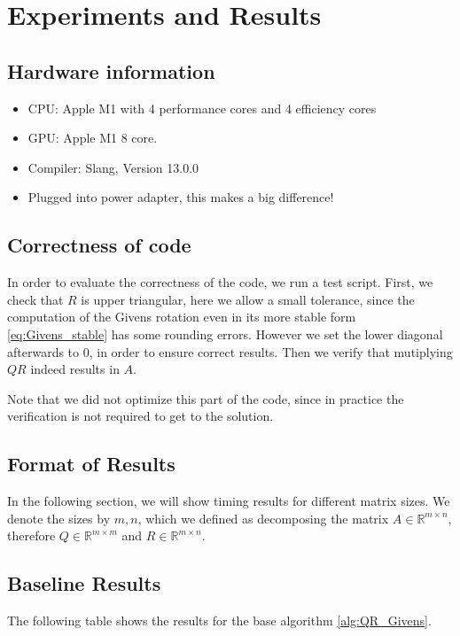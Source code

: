 \documentclass[a4paper]{scrartcl}
\begin{document}
\section{Experiments and Results}

    \subsection{Hardware information}
        \begin{itemize}
            \item CPU: Apple M1 with 4 performance cores and 4 efficiency cores
            \item GPU: Apple M1 8 core.
            \item Compiler: Slang, Version 13.0.0
            \item Plugged into power adapter, this makes a big difference!
        \end{itemize}

    \subsection{Correctness of code}
        In order to evaluate the correctness of the code, we run a test script.
        First, we check that $R$ is upper triangular, here we allow a small
        tolerance, since the computation of the Givens rotation even in its more
        stable form \ref{eq:Givens_stable} has some rounding errors. However we
        set the lower diagonal afterwards to 0, in order to ensure correct
        results. Then we verify that mutiplying $QR$ indeed results in $A$.
        
        Note that we did not optimize this part of the code, since in practice
        the verification is not required to get to the solution.

    \subsection{Format of Results}
        In the following section, we will show timing results for different
        matrix sizes. We denote the sizes by $m,n$, which we defined as
        decomposing the matrix $A \in \mathbb{R}^{m\times n}$, therefore $Q \in
        \mathbb{R}^{m\times m}$ and $R\in \mathbb{R}^{m\times n}$.

    \subsection{Baseline Results}\label{res:Baseline}
        The following table shows the results for the base algorithm
        \ref{alg:QR_Givens}.
        
\end{document}
